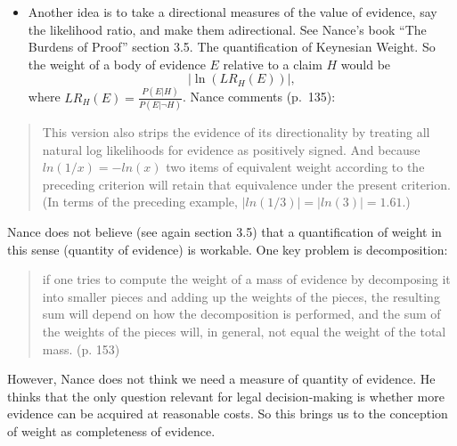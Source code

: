 \documentclass[
  10pt,
  dvipsnames,enabledeprecatedfontcommands]{scrartcl}
\providecommand{\tightlist}{%
  \setlength{\itemsep}{0pt}\setlength{\parskip}{0pt}}
\begin{document}

\begin{itemize}
\tightlist
\item
  Another idea is to take a directional measures of the value of
  evidence, say the likelihood ratio, and make them adirectional. See
  Nance's book ``The Burdens of Proof'' section 3.5. The quantification
  of Keynesian Weight. So the weight of a body of evidence \(E\)
  relative to a claim \(H\) would be \[\vert \ln (LR_H(E)) \vert, \]
  where \(LR_H(E)=\frac{P(E \vert H)}{P(E \vert \neg H)}\). Nance
  comments (p.~135):
\end{itemize}

\begin{quote}
This version also strips the evidence of its directionality by treating all natural log likelihoods for evidence as positively signed. And because 
$ln(1/x) = -ln(x)$
two items of equivalent weight according to the preceding criterion will retain that equivalence under the present criterion. (In terms of the preceding example, 
$|ln(1/3)|= |ln(3)| = 1.61.$)
\end{quote}

Nance does not believe (see again section 3.5) that a quantification of
weight in this sense (quantity of evidence) is workable. One key problem
is decomposition:

\begin{quote}
 if one tries to compute the weight of a mass of evidence by decomposing it into smaller pieces and adding up the weights of the pieces, the resulting sum will depend on how the decomposition is performed, and the sum of the weights of the pieces will, in general, not equal the weight of the total mass. (p. 153)
\end{quote}


However, Nance does not think we need a measure of quantity of evidence.
He thinks that the only question relevant for legal decision-making is
whether more evidence can be acquired at reasonable costs.
So this brings us to the conception of weight as completeness of
evidence.
\end{document}
